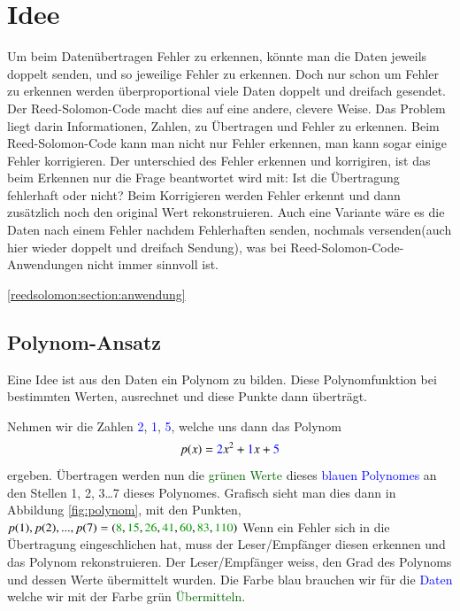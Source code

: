 %
%
%
\section{Idee
\label{reedsolomon:section:idee}}
Um beim Datenübertragen Fehler zu erkennen, könnte man die Daten jeweils doppelt senden,
und so jeweilige Fehler zu erkennen.
Doch nur schon um Fehler zu erkennen werden überproportional viele Daten doppelt und dreifach gesendet.
Der Reed-Solomon-Code macht dies auf eine andere, clevere Weise.
Das Problem liegt darin Informationen, Zahlen, 
zu Übertragen und Fehler zu erkennen.
Beim Reed-Solomon-Code kann man nicht nur Fehler erkennen, 
man kann sogar einige Fehler korrigieren.
Der unterschied des Fehler erkennen und korrigiren, ist das beim Erkennen nur die Frage beantwortet wird mit: Ist die Übertragung fehlerhaft oder nicht?
Beim Korrigieren werden Fehler erkennt und dann zusätzlich noch den original Wert rekonstruieren.
Auch eine Variante wäre es die Daten nach einem Fehler nachdem Fehlerhaften senden, nochmals versenden(auch hier wieder doppelt und dreifach Sendung), 
was bei Reed-Solomon-Code-Anwendungen nicht immer sinnvoll ist. 

\ref{reedsolomon:section:anwendung}

\subsection{Polynom-Ansatz
\label{reedsolomon:section:polynomansatz}}
Eine Idee ist aus den Daten ein Polynom zu bilden.
Diese Polynomfunktion bei bestimmten Werten, ausrechnet und diese Punkte dann überträgt.
\begin{beispiel} Nehmen wir die Zahlen \textcolor{blue}{2}, \textcolor{blue}{1}, \textcolor{blue}{5},
welche uns dann das Polynom 
\begin{equation}
p(x)
=
\textcolor{blue}{2}x^2 + \textcolor{blue}{1}x + \textcolor{blue}{5}
\label{reedsolomon:equation1}
\end{equation}
ergeben.
Übertragen werden nun die \textcolor{darkgreen}{grünen Werte} 
dieses \textcolor{blue}{blauen Polynomes} an den Stellen 1, 2, 3\dots 7 dieses Polynomes.
Grafisch sieht man dies dann in Abbildung \ref{fig:polynom}, 
mit den Punkten, $p(1),p(2),...,p(7) = (\textcolor{darkgreen}{8}, 
\textcolor{darkgreen}{15}, \textcolor{darkgreen}{26},
\textcolor{darkgreen}{41}, \textcolor{darkgreen}{60}, 
\textcolor{darkgreen}{83}, \textcolor{darkgreen}{110})$
Wenn ein Fehler sich in die Übertragung eingeschlichen hat, muss der Leser/Empfänger diesen erkennen und das Polynom rekonstruieren.
Der Leser/Empfänger weiss, den Grad des Polynoms und dessen Werte übermittelt wurden. 
Die Farbe blau brauchen wir für die \textcolor{blue}{Daten} welche wir mit der Farbe grün \textcolor{darkgreen}{Übermitteln}.
\end{beispiel}

